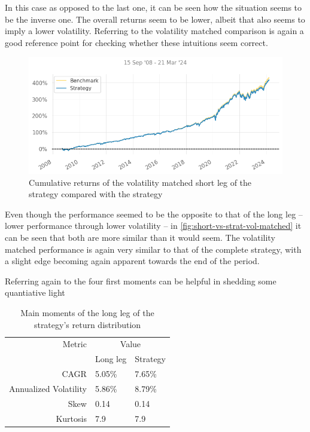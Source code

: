 In this case as opposed to the last one, it can be seen how the situation seems to be the inverse one. The overall returns seem to be lower, albeit that also seems to imply a lower volatility. Referring to the volatility matched comparison is again a good reference point for checking whether these intuitions seem correct.

\begin{figure}[ht]
    \includegraphics[width=\linewidth]{assets/short-vs-strat-vol-matched.png}
    \caption{Cumulative returns of the volatility matched short leg of the strategy compared with the strategy}
    \label{fig:short-vs-strat-vol-matched}
\end{figure}

Even though the performance seemed to be the opposite to that of the long leg -- lower performance through lower volatility -- in \autoref{fig:short-vs-strat-vol-matched} it can be seen that both are more similar than it would seem. The volatility matched performance is again very similar to that of the complete strategy, with a slight edge becoming again apparent towards the end of the period.

Referring again to the four first moments can be helpful in shedding some quantiative light

\begin{table}[ht]
    \centering
    \begin{tabular}{rll}
        \toprule
        Metric & \multicolumn{2}{c}{Value} \\ 
        \cmidrule(lr){2-3}
            & Long leg & Strategy \\
        \midrule
        CAGR & 5.05\% & 7.65\% \\
        Annualized Volatility & 5.86\% & 8.79\% \\
        Skew & 0.14 & 0.14 \\
        Kurtosis & 7.9 & 7.9 \\
        \bottomrule
    \end{tabular}
    \caption{Main moments of the long leg of the strategy's return distribution}
    \label{table:main-moments-short-vs-strat}
\end{table}

